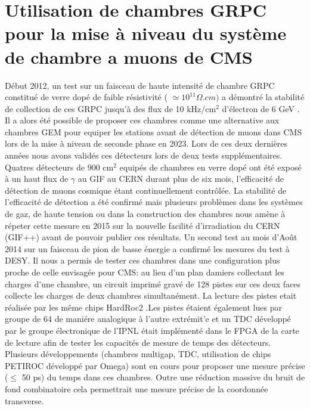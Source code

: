 \documentclass[9pt,french]{article}
\begin{document}
\section*{Utilisation de chambres GRPC pour la mise \`a niveau du syst\`eme de chambre a muons de CMS}

D\'ebut 2012, un test sur un faisceau de haute intensit\'e de chambre GRPC constitu\'e de verre dop\'e de faible r\'esistivit\'e ( $ \simeq 10^{11} \Omega.cm) $ a d\'emontr\'e la stabilit\'e de collection de ces GRPC jusqu'\`a des flux de 10 kHz/cm$^2$ d'\'electron de 6 GeV \cite{desy}. Il a alors \'et\'e possible de proposer ces chambres comme une alternative aux chambres GEM pour equiper les stations avant de d\'etection de muons dans CMS lors de la mise \`a niveau de seconde phase en 2023. Lors de ces deux derni\`eres ann\'ees nous avons valid\'es ces d\'etecteurs lors de deux tests suppl\'ementaires. Quatres d\'etecteurs de 900 cm$^2$ equip\'es de chambres en verre dop\'e ont \'et\'e expos\'e \`a un haut flux de $\gamma$ au GIF au CERN durant plus de six mois, l'efficacit\'e de d\'etection de muons cosmique \'etant continuellement contr\^ol\'ee. La stabilit\'e de l'efficacit\'e de d\'etection a \'et\'e confirm\'e mais plusieurs probl\`emes dans les syst\`emes de gaz, de haute tension ou dans la construction des chambres nous am\`ene \`a r\'epeter cette mesure en 2015 sur la nouvelle facilit\'e d'irradiation du CERN (GIF++) avant de pouvoir publier ces r\'esultats. Un second test au mois d'Ao\^ut 2014 sur un faisceau de pion de basse \'energie a confirm\'e les mesures du test \`a DESY. Il nous a permis de tester ces chambres dans une configuration plus proche de celle envisag\'ee pour CMS: au lieu d'un plan damiers collectant les charges d'une chambre, un circuit imprim\'e grav\'e de 128 pistes sur ces deux faces collecte les charges de deux chambres simultan\'ement. La lecture des pistes etait r\'ealis\'ee par les m\^eme chips HardRoc2 .Les pistes \'etaient \'egalement lues par groupe de 64 de mani\'ere analogique \`a l'autre extr\'emit'e et un TDC d\'evelopp\'e par le groupe \'electronique de l'IPNL \'etait impl\'ement\'e dans le FPGA de la carte de lecture afin de tester les capacit\'es  de mesure de temps des d\'etecteurs. Plusieurs d\'eveloppements (chambres multigap, TDC, utilisation de chips PETIROC d\'evelopp\'e par Omega) sont en cours pour proposer une mesure pr\'ecise ($\le$ 50 ps) du temps dans ces chambres. Outre une r\'eduction massive du bruit de fond combinatoire cela permettrait une mesure pr\'ecise de la coordonn\'ee transverse.            
\end{document}
